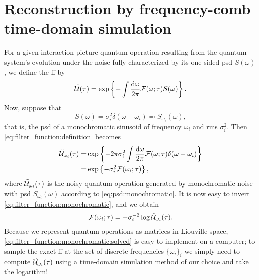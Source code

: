 \chapter{Reconstruction by frequency-comb time-domain simulation}\label{ch:filter_functions:validation}
For a {\color{RWTHmagenta75} given} interaction-picture quantum operation \liouvUe resulting from the quantum system's evolution under the noise fully characterized by its one-sided \gls{psd} $S(\omega)$, we define the \gls{ff} \FF by
\begin{align}
    \label{eq:filter_function:definition}
    \mathcal{\tilde{U}}(\tau) = \exp\left\{-\int\frac{\dd{\omega}}{2\pi}\mathcal{F}(\omega;\tau) S(\omega)\right\}.
\end{align}
Now, suppose that
\begin{equation}
    \label{eq:psd:monochromatic}
    S(\omega) = \sigma_i^2 \delta(\omega - \omega_i) \eqqcolon S_{\omega_i}(\omega),
\end{equation} 
that is, the \gls{psd} of a monochromatic sinusoid of frequency $\omega_i$ and \gls{rms} $\sigma_i^2$.
Then \cref{eq:filter_function:definition} becomes
\begin{equation}
    \label{eq:filter_function:monochromatic}
    \begin{split}
        \mathcal{\tilde{U}}_{\omega_i}(\tau) =& \exp\left\lbrace -2\pi\sigma_i^2\int\frac{\dd{\omega}}{2\pi}\mathcal{F}(\omega;\tau)\delta(\omega - \omega_i)\right\rbrace \\
                                  =& \exp\left\lbrace -\sigma_i^2\mathcal{F}(\omega_i;\tau)\right\rbrace,
    \end{split}
\end{equation}
where $\mathcal{\tilde{U}}_{\omega_i}(\tau)$ is the noisy quantum operation generated by monochromatic noise with \gls{psd} $S_{\omega_i}(\omega)$ according to \cref{eq:psd:monochromatic}.
It is now easy to invert \cref{eq:filter_function:monochromatic}, and we obtain
\begin{align}
    \label{eq:filter_function:monochromatic:solved}
    \mathcal{F}(\omega_i; \tau) = -\sigma_i^{-2}\log\mathcal{\tilde{U}}_{\omega_i}(\tau).
\end{align}
Because we represent quantum operations as matrices in Liouville space, \cref{eq:filter_function:monochromatic:solved} is easy to implement on a computer; to sample the exact \gls{ff} at the set of discrete frequencies $\lbrace\omega_i\rbrace_i$ we simply need to compute $\mathcal{\tilde{U}}_{\omega_i}(\tau)$  using a time-domain simulation method of our choice and take the logarithm!

